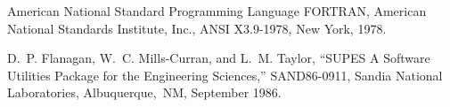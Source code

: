 \begin{thebibliography}{999}

\filbreak{} American National Standard Programming
                        Language FORTRAN,
                        American National Standards Institute, Inc.,
                        ANSI X3.9-1978, New York, 1978. 

\filbreak{}
D.~P. Flanagan, W.~C. Mills-Curran, and L.~M. Taylor, ``{SUPES} A Software
  Utilities Package for the Engineering Sciences,'' SAND86-0911, Sandia
  National Laboratories, Albuquerque,~NM, September 1986.

\end{thebibliography}
